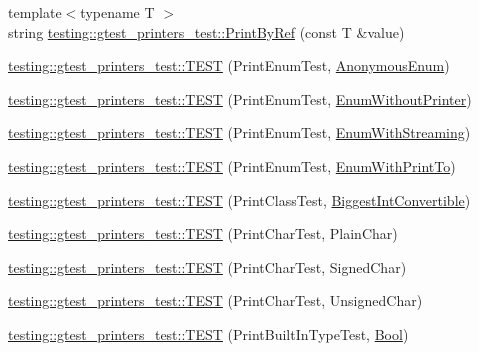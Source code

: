 \begin{DoxyCompactItemize}
{\footnotesize template$<$typename T $>$ }\\string \hyperlink{namespacetesting_1_1gtest__printers__test_a8e4be1dea6a05e53db4fd20d259ffdd7}{testing\+::gtest\+\_\+printers\+\_\+test\+::\+Print\+By\+Ref} (const T \&value)
\item 
\hyperlink{namespacetesting_1_1gtest__printers__test_ac79ac1529e754dddbaff5ba108ba3de3}{testing\+::gtest\+\_\+printers\+\_\+test\+::\+T\+E\+ST} (Print\+Enum\+Test, \hyperlink{gtest-printers__test_8cc_a7a5ee9fe858568a85d80af1312aefb8b}{Anonymous\+Enum})
\item 
\hyperlink{namespacetesting_1_1gtest__printers__test_ae435934e9be88c7813ac6aee2ce0ce53}{testing\+::gtest\+\_\+printers\+\_\+test\+::\+T\+E\+ST} (Print\+Enum\+Test, \hyperlink{gtest-printers__test_8cc_a404f735da62338180a19ae16f80e09c8}{Enum\+Without\+Printer})
\item 
\hyperlink{namespacetesting_1_1gtest__printers__test_a152cda5e11caecc372208103022726d1}{testing\+::gtest\+\_\+printers\+\_\+test\+::\+T\+E\+ST} (Print\+Enum\+Test, \hyperlink{gtest-printers__test_8cc_a52d9f846ca7a081ba3acf88dd6cd46dc}{Enum\+With\+Streaming})
\item 
\hyperlink{namespacetesting_1_1gtest__printers__test_a171e23e5a52e6b7355c00daf8391ec12}{testing\+::gtest\+\_\+printers\+\_\+test\+::\+T\+E\+ST} (Print\+Enum\+Test, \hyperlink{gtest-printers__test_8cc_a904d619d593201ed509be794aed041ec}{Enum\+With\+Print\+To})
\item 
\hyperlink{namespacetesting_1_1gtest__printers__test_a46ee2873cfeb51db5f56be0960ce333b}{testing\+::gtest\+\_\+printers\+\_\+test\+::\+T\+E\+ST} (Print\+Class\+Test, \hyperlink{classBiggestIntConvertible}{Biggest\+Int\+Convertible})
\item 
\hyperlink{namespacetesting_1_1gtest__printers__test_aa0a012b88bd8dee46707bf308aa312d1}{testing\+::gtest\+\_\+printers\+\_\+test\+::\+T\+E\+ST} (Print\+Char\+Test, Plain\+Char)
\item 
\hyperlink{namespacetesting_1_1gtest__printers__test_a08fe11b61c0ff62931f0172dc05c971b}{testing\+::gtest\+\_\+printers\+\_\+test\+::\+T\+E\+ST} (Print\+Char\+Test, Signed\+Char)
\item 
\hyperlink{namespacetesting_1_1gtest__printers__test_a54554ba079349cf09dcb6d522cfb70de}{testing\+::gtest\+\_\+printers\+\_\+test\+::\+T\+E\+ST} (Print\+Char\+Test, Unsigned\+Char)
\item 
\hyperlink{namespacetesting_1_1gtest__printers__test_a6f08c464dc0b8eb822368f552d4467ad}{testing\+::gtest\+\_\+printers\+\_\+test\+::\+T\+E\+ST} (Print\+Built\+In\+Type\+Test, \hyperlink{structBool}{Bool})

\end{DoxyCompactItemize}
